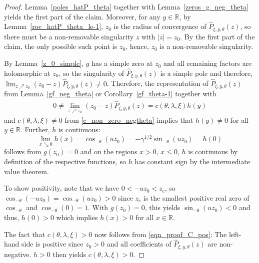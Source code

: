 \documentclass[10pt,a4paper]{amsart}
\newcommand{\R}{\mathbb{R}} %
\newcommand{\1}{\mathds{1}}
\begin{document}
\begin{proof}
   Lemma~\ref{poles_hatP_theta} together with Lemma~\ref{zeros_g_neg_theta} yields the first part of the claim. Moreover, for any $y\in\R$, by Lemma~\ref{roc_hatP_theta_le-1}, $z_0$ is the radius of convergence of $\hat{P}_{\xi,y,\theta}(z)$, so there must be a non-removable singularity $z$ with $|z|=z_0$. By the first part of the claim, the only possible such point is $z_0$, hence, $z_0$ is a non-removable singularity. 
   
   By Lemma~\ref{z_0_simple}, $g$ has a simple zero at $z_0$ and all remaining factors are holomorphic at $z_0$, so the singularity of $\hat{P}_{\xi,y,\theta}(z)$ is a simple pole and therefore, $\lim_{z\nearrow z_0}(z_0-z)\hat{P}_{\xi,y,\theta}(z)\ne 0$. Therefore, the representation of $\hat{P}_{\xi,y,\theta}(z)$ from Lemma~\ref{gf_neg_theta} or Corollary~\ref{gf_theta-1} together with
   \begin{align}\label{eqn_proof_C_pos}
       0\ne \lim_{z\nearrow z_0}(z_0-z)\hat{P}_{\xi,y,\theta}(z)=c(\theta,\lambda,\xi)h(y)
   \end{align}
    and $c(\theta,\lambda,\xi)\ne 0$ from \eqref{c_non_zero_negtheta} implies that $h(y)\neq 0$ for all $y\in\R$.  
    Further, $h$ is continuous: $$\lim_{x\searrow 0}h(x)=\cos_{-\theta}\left(u z_0\right)=-\gamma^{1/2}\sin_{-\theta}\left(u z_0\right)=h(0)$$ follows from $g(z_0)=0$ and on the regions $x>0$, $x\le 0$, $h$ is continuous by definition of the respective functions, so $h$ has constant sign by the intermediate value theorem. 
    
    To show positivity, note that we have $0<-u{z_0}<z_c$, so $\cos_{-\theta}(-u{z_0})=\cos_{-\theta}(u{z_0})> 0$ since $z_c$ is the smallest positive real zero of $\cos_{-\theta}$ and $\cos_{-\theta}(0)=1$. With $g(z_0)=0$, this yields $\sin_{-\theta}(u{z_0})<0$ and thus, $h(0)>0$ which implies $h(x)>0$ for all $x\in\R$.
    
    The fact that $c(\theta,\lambda,\xi)>0$ now follows from \eqref{eqn_proof_C_pos}: The left-hand side is positive since $z_0>0$ and all coefficients of $\hat{P}_{\xi,y,\theta}(z)$ are non-negative. $h>0$ then yields $c(\theta,\lambda,\xi)>0$.
\end{proof}
\end{document}

